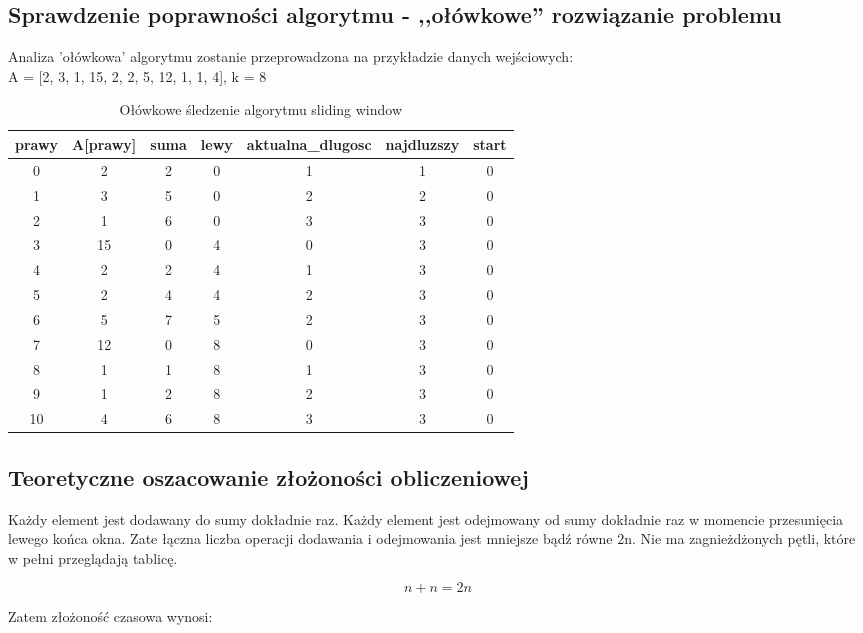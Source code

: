 \documentclass{article}
\begin{document}
\subsection{Sprawdzenie poprawności algorytmu - ,,ołówkowe'' rozwiązanie problemu}
Analiza 'ołówkowa' algorytmu zostanie przeprowadzona na przykładzie danych wejściowych: \\
A = [2, 3, 1, 15, 2, 2, 5, 12, 1, 1, 4], k = 8

\begin{table}[h!]
\centering
\begin{tabular}{|c|c|c|c|c|c|c|}
\hline
prawy & A[prawy] & suma & lewy & aktualna\_dlugosc & najdluzszy & start \\
\hline
0  & 2   & 2  & 0  & 1  & 1  & 0 \\
1  & 3   & 5  & 0  & 2  & 2  & 0 \\
2  & 1   & 6  & 0  & 3  & 3  & 0 \\
3  & 15  & 0  & 4  & 0  & 3  & 0 \\
4  & 2   & 2  & 4  & 1  & 3  & 0 \\
5  & 2   & 4  & 4  & 2  & 3  & 0 \\
6  & 5   & 7  & 5  & 2  & 3  & 0 \\
7  & 12  & 0  & 8  & 0  & 3  & 0 \\
8  & 1   & 1  & 8  & 1  & 3  & 0 \\
9  & 1   & 2  & 8  & 2  & 3  & 0 \\
10 & 4   & 6  & 8  & 3  & 3  & 0 \\
\hline
\end{tabular}
\caption{Ołówkowe śledzenie algorytmu sliding window}
\label{tab:window_olowkowe}
\end{table}

\subsection{Teoretyczne oszacowanie złożoności obliczeniowej}
Każdy element jest dodawany do sumy dokładnie raz. Każdy element jest odejmowany od sumy dokładnie raz w momencie przesunięcia lewego końca okna. Zate łączna liczba operacji dodawania i odejmowania jest mniejsze bądź równe 2n. Nie ma zagnieżdżonych pętli, które w pełni przeglądają tablicę.

{ \Large
\begin{equation}
    n + n = 2n
\end{equation}
}

Zatem złożoność czasowa wynosi:
\end{document}

